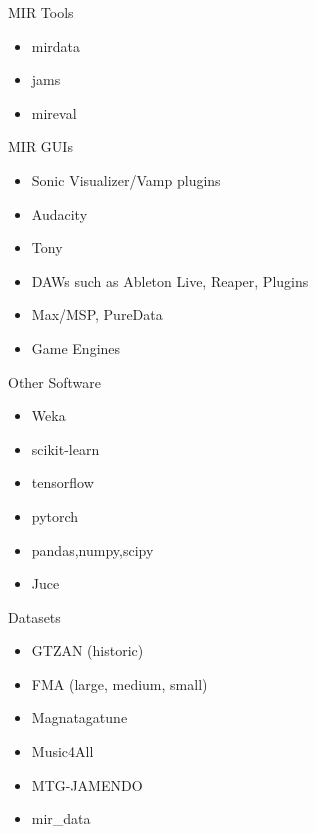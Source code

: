 \documentclass[12pt]{beamer}
\begin{document}
\begin{frame}{MIR Tools}
  \begin{itemize}
  \item{mirdata}
  \item{jams}
  \item{mireval} 
  \end{itemize} 
\end{frame} 


\begin{frame}{MIR GUIs}
  \begin{itemize}
  \item{Sonic Visualizer/Vamp plugins}
  \item{Audacity}
  \item{Tony}
  \item{DAWs such as Ableton Live, Reaper, Plugins}
  \item{Max/MSP, PureData}
  \item{Game Engines}
  \end{itemize} 
\end{frame}

\begin{frame}{Other Software}
  \begin{itemize}
    \item{Weka} 
    \item{scikit-learn}
    \item{tensorflow}
    \item{pytorch}
    \item{pandas,numpy,scipy}
    \item{Juce} 
    \end{itemize} 
\end{frame} 



\begin{frame}{Datasets}
  \begin{itemize}
  \item{GTZAN (historic)}
  \item{FMA (large, medium, small)}
  \item{Magnatagatune}
  \item{Music4All}
  \item{MTG-JAMENDO}
  \item{mir\_data}
  \end{itemize}
\end{frame}
\end{document}

